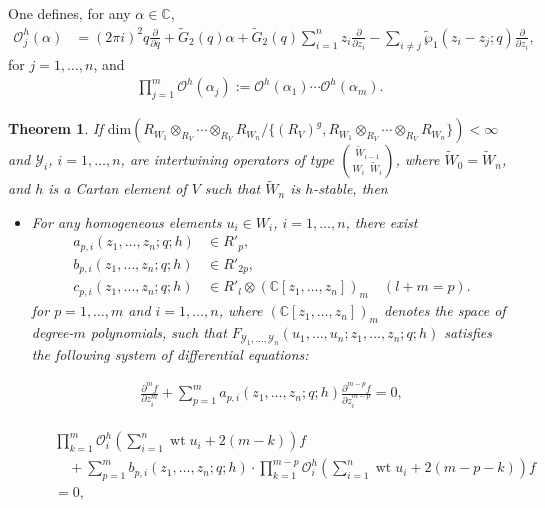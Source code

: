 \documentclass[9pt]{amsart}
\newtheorem{theorem}{Theorem}[section]
\begin{document}
One defines, for any $\alpha \in \mathbb{C}$,
\begin{align}
\mathcal{O}_{j}^{h}(\alpha) 
&= (2\pi i)^2 q \frac{\partial}{\partial q}
+ \tilde{G}_{2}(q)\alpha 
+ \tilde{G}_{2}(q) \sum_{i=1}^{n} z_{i} \frac{\partial}{\partial z_{i}} 
- \sum_{i \neq j} \tilde{\wp}_{1}(z_{i} - z_{j}; q) \frac{\partial}{\partial z_{i}},
\end{align}
for $j = 1, \dots, n$, and
\begin{align}
\prod_{j=1}^{m} \mathcal{O}^{h}(\alpha_{j}) 
:= \mathcal{O}^{h}(\alpha_{1}) \cdots \mathcal{O}^{h}(\alpha_{m}).
\end{align}

\begin{theorem}\label{maint1}
 If $\text{dim}(R_{W_1}\otimes_{R_V} \cdots \otimes_{R_V} R_{W_n}/\{(R_V)^g, R_{W_1}\otimes_{R_V} \cdots \otimes_{R_V} R_{W_n}\}) < \infty$ and $\mathcal{Y}_{i}$, $i = 1, \dots, n$, are intertwining operators of type $\displaystyle\binom{\tilde{W}_{i-1}}{W_{i}\;\; \tilde{W}_{i}}$, where $\tilde{W}_0 = \tilde{W}_n$, and $h$ is a Cartan element of $V$ such that $\tilde{W}_n$ is $h$-stable, then

\begin{itemize}
    \item For any homogeneous elements $u_{i} \in W_{i}$, $i = 1, \dots, n$, there exist
\begin{align*}
a_{p,i}(z_1, \dots, z_n; q; h) &\in R'_{p}, \\
b_{p,i}(z_1, \dots, z_n; q; h) &\in R'_{2p}, \\
c_{p,i}(z_1, \dots, z_n; q; h) &\in R'_{l} \otimes (\mathbb{C}[z_1, \dots, z_n])_m \quad (l + m = p).
\end{align*}    for $p = 1, \dots, m$ and $i = 1, \dots, n$, where $(\mathbb{C}[z_1, \dots, z_n])_m$ denotes the space of degree-$m$ polynomials, such that $F_{\mathcal{Y}_{1}, \dots, \mathcal{Y}_{n}}(u_1, \dots, u_n; z_1, \dots, z_n; q; h)$ satisfies the following system of differential equations:

\begin{align}\label{equatio1}
    \frac{\partial^{m} f}{\partial z_i^{m}} + \sum_{p=1}^{m} a_{p,i}(z_1, \dots, z_n; q; h) \frac{\partial^{m-p} f}{\partial z_i^{m-p}} = 0,
\end{align}

\begin{align}\label{91'}
\begin{split}
    & \prod_{k=1}^{m} 
    \mathcal{O}^{h}_i\left( \sum_{i=1}^{n} \operatorname{wt} u_i + 2(m - k) \right) f \\
    &\quad + \sum_{p=1}^{m} b_{p,i}(z_1, \dots, z_n; q; h) \cdot 
    \prod_{k=1}^{m-p} 
    \mathcal{O}^{h}_i\left( \sum_{i=1}^{n} \operatorname{wt} u_i + 2(m - p - k) \right) f \\
    &= 0,
\end{split}
\end{align}


\end{itemize}
\end{theorem}
\end{document}
